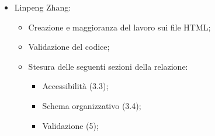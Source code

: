 \begin{itemize}
	\item Linpeng Zhang:
	\begin{itemize}
		\item Creazione e maggioranza del lavoro sui file HTML;
		\item Validazione del codice;
		\item Stesura delle seguenti sezioni della relazione:
		\begin{itemize}
				\item Accessibilità (3.3);
				\item Schema organizzativo (3.4);
				\item Validazione (5);
			\end{itemize}
	\end{itemize}
\end{itemize}